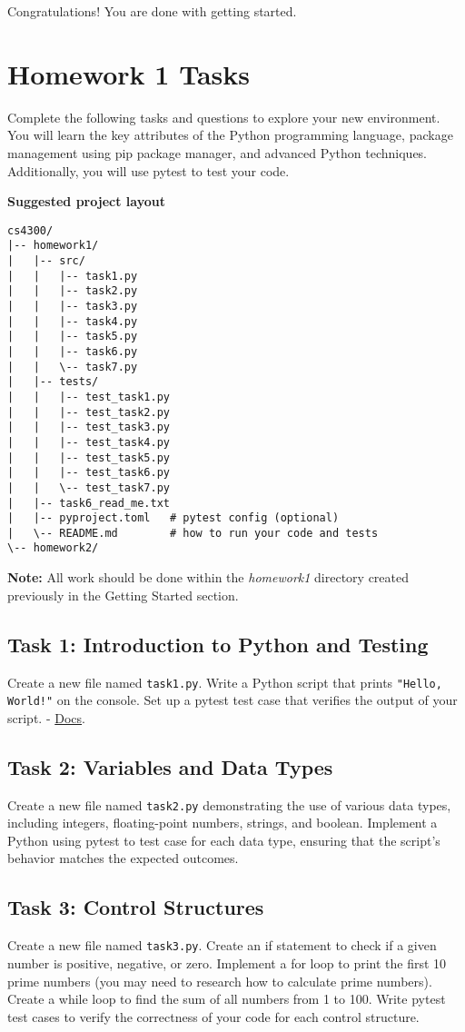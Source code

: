 \documentclass{article}
\begin{document}
Congratulations! You are done with getting started. 

\section{Homework 1 Tasks}
Complete the following tasks and questions to explore your new environment. You will learn the key attributes of the Python programming language, package management using pip package manager, and advanced Python techniques. Additionally, you will use pytest to test your code.
\newpage 
\begin{center}
\textbf{Suggested project layout}
\end{center}
\begin{lstlisting}[style=customcode]
cs4300/
|-- homework1/
|   |-- src/
|   |   |-- task1.py
|   |   |-- task2.py
|   |   |-- task3.py
|   |   |-- task4.py
|   |   |-- task5.py
|   |   |-- task6.py
|   |   \-- task7.py
|   |-- tests/
|   |   |-- test_task1.py
|   |   |-- test_task2.py
|   |   |-- test_task3.py
|   |   |-- test_task4.py
|   |   |-- test_task5.py
|   |   |-- test_task6.py
|   |   \-- test_task7.py
|   |-- task6_read_me.txt
|   |-- pyproject.toml   # pytest config (optional)
|   \-- README.md        # how to run your code and tests
\-- homework2/
\end{lstlisting}
\textbf{Note:} All work should be done within the \textit{homework1} directory created previously in the Getting Started section.

\subsection{Task 1: Introduction to Python and Testing}
Create a new file named \verb|task1.py|. Write a Python script that prints \verb|"Hello, World!"| on the console. Set up a pytest test case that verifies the output of your script. - \href{https://docs.pytest.org/en/stable/getting-started.html}{Docs}. 

\subsection{Task 2: Variables and Data Types}
Create a new file named \verb|task2.py| demonstrating the use of various data types, including integers, floating-point numbers, strings, and boolean. Implement a Python using pytest to test case for each data type, ensuring that the script's behavior matches the expected outcomes.

\subsection{Task 3: Control Structures}
Create a new file named \verb|task3.py|. Create an if statement to check if a given number is positive, negative, or zero. Implement a for loop to print the first 10 prime numbers (you may need to research how to calculate prime numbers). Create a while loop to find the sum of all numbers from 1 to 100. Write pytest test cases to verify the correctness of your code for each control structure.
\end{document}
